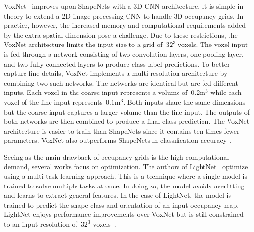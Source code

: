 VoxNet~\cite{Maturana2015} improves upon ShapeNets with a 3D CNN architecture. It is simple in theory to extend a 2D image processing CNN to handle 3D occupancy grids. In practice, however, the increased memory and computational requirements added by the extra spatial dimension pose a challenge. Due to these restrictions, the VoxNet architecture limits the input size to a grid of~$32^3$ voxels. The voxel input is fed through a network consisting of two convolution layers, one pooling layer, and two fully-connected layers to produce class label predictions. To better capture fine details, VoxNet implements a multi-resolution architecture by combining two such networks. The networks are identical but are fed different inputs. Each voxel in the coarse input represents a volume of~$0.2\text{m}^3$ while each voxel of the fine input represents~$0.1\text{m}^3$. Both inputs share the same dimensions but the coarse input captures a larger volume than the fine input. The outputs of both networks are then combined to produce a final class prediction. The VoxNet architecture is easier to train than ShapeNets since it contains ten times fewer parameters. VoxNet also outperforms ShapeNets in classification accuracy~\cite{Maturana2015}.

Seeing as the main drawback of occupancy grids is the high computational demand, several works focus on optimization. The authors of LightNet~\cite{Zhi2017} optimize using a multi-task learning approach. This is a technique where a single model is trained to solve multiple tasks at once. In doing so, the model avoids overfitting and learns to extract general features. In the case of LightNet, the model is trained to predict the shape class and orientation of an input occupancy map. LightNet enjoys performance improvements over VoxNet but is still constrained to an input resolution of~$32^3$ voxels~\cite{Zhi2017}. 

